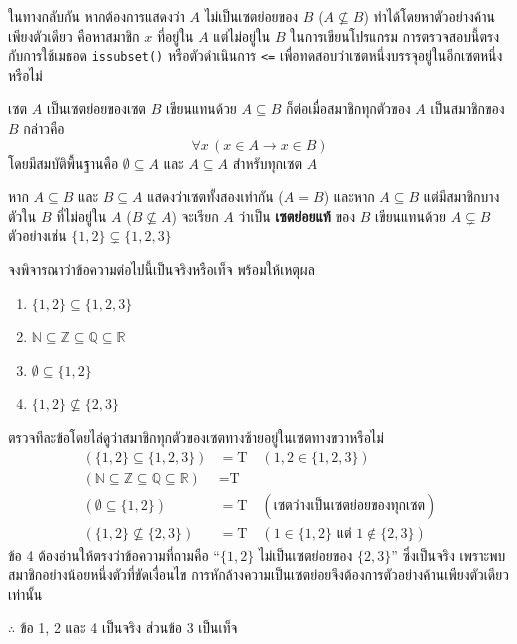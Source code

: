 ในทางกลับกัน หากต้องการแสดงว่า $A$ ไม่เป็นเซตย่อยของ $B$ ($A \not\subseteq B$) ทำได้โดยหาตัวอย่างค้านเพียงตัวเดียว คือหาสมาชิก $x$ ที่อยู่ใน $A$ แต่ไม่อยู่ใน $B$ ในการเขียนโปรแกรม การตรวจสอบนี้ตรงกับการใช้เมธอด \texttt{issubset()} หรือตัวดำเนินการ \texttt{<=} เพื่อทดสอบว่าเซตหนึ่งบรรจุอยู่ในอีกเซตหนึ่งหรือไม่~\parencite{halmos1974naive}

\begin{definition}
เซต $A$ เป็นเซตย่อยของเซต $B$ เขียนแทนด้วย $A \subseteq B$ ก็ต่อเมื่อสมาชิกทุกตัวของ $A$ เป็นสมาชิกของ $B$ กล่าวคือ
\[
\forall x \, (x \in A \rightarrow x \in B)
\]
โดยมีสมบัติพื้นฐานคือ $\emptyset \subseteq A$ และ $A \subseteq A$ สำหรับทุกเซต $A$

หาก $A \subseteq B$ และ $B \subseteq A$ แสดงว่าเซตทั้งสองเท่ากัน ($A = B$) และหาก $A \subseteq B$ แต่มีสมาชิกบางตัวใน $B$ ที่ไม่อยู่ใน $A$ ($B \not\subseteq A$) จะเรียก $A$ ว่าเป็น \textbf{เซตย่อยแท้} ของ $B$ เขียนแทนด้วย $A \subsetneq B$ ตัวอย่างเช่น $\{1, 2\} \subsetneq \{1, 2, 3\}$
\end{definition}

\begin{ex}
\label{ex:subset-check}
จงพิจารณาว่าข้อความต่อไปนี้เป็นจริงหรือเท็จ พร้อมให้เหตุผล
\begin{enumerate}
    \item $\{1, 2\} \subseteq \{1, 2, 3\}$
    \item $\mathbb{N} \subseteq \mathbb{Z} \subseteq \mathbb{Q} \subseteq \mathbb{R}$
    \item $\emptyset \subseteq \{1, 2\}$
    \item $\{1, 2\} \not\subseteq \{2, 3\}$
\end{enumerate}
\end{ex}

\begin{solution}
ตรวจทีละข้อโดยไล่ดูว่าสมาชิกทุกตัวของเซตทางซ้ายอยู่ในเซตทางขวาหรือไม่
\begin{align*}
(\{1,2\} \subseteq \{1,2,3\}) &= \text{T} \quad (1,2 \in \{1,2,3\})\\
(\mathbb{N} \subseteq \mathbb{Z} \subseteq \mathbb{Q} \subseteq \mathbb{R}) &= \text{T}\\
(\emptyset \subseteq \{1,2\}) &= \text{T} \quad (\text{เซตว่างเป็นเซตย่อยของทุกเซต})\\
(\{1,2\} \not\subseteq \{2,3\}) &= \text{T} \quad (1 \in \{1,2\} \text{ แต่ } 1 \notin \{2,3\})
\end{align*}
ข้อ 4 ต้องอ่านให้ตรงว่าข้อความที่ถามคือ ``$\{1,2\}$ ไม่เป็นเซตย่อยของ $\{2,3\}$'' ซึ่งเป็นจริง เพราะพบสมาชิกอย่างน้อยหนึ่งตัวที่ขัดเงื่อนไข การหักล้างความเป็นเซตย่อยจึงต้องการตัวอย่างค้านเพียงตัวเดียวเท่านั้น

$\therefore$ ข้อ 1, 2 และ 4 เป็นจริง ส่วนข้อ 3 เป็นเท็จ \solhere
\end{solution}

